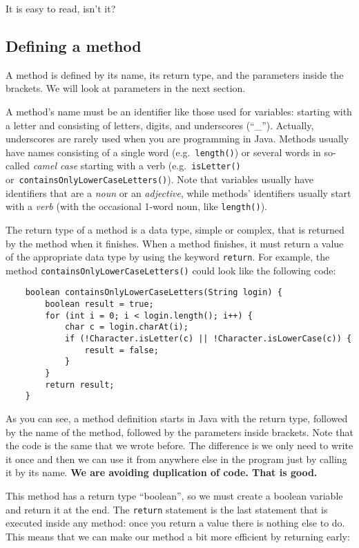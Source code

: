 It is easy to read, isn't it?

\subsection{Defining a method}

A method is defined by its name, its return type, and the parameters
inside the brackets. We will look at parameters in the next section.

A method's name must be an identifier
like those used for variables: starting with a letter and consisting
of letters, digits, and underscores (``\_''). Actually, underscores
are rarely used when you are programming in Java. Methods
usually have names consisting of a single word
(e.g.~\verb+length()+) or several words in so-called \emph{camel case}
starting with a verb (e.g.~\verb+isLetter()+
or~\verb+containsOnlyLowerCaseLetters()+). Note that variables usually
have identifiers that are a \emph{noun} or an \emph{adjective}, 
while methods' identifiers usually start with a \emph{verb} 
(with the occasional 1-word noun, like \verb+length()+).

The return type of a method is a data type, simple or complex, that is
returned by the method when it finishes. When a method finishes, it
must return a value of the appropriate data type by using the keyword
\verb+return+. For example, the method
\verb+containsOnlyLowerCaseLetters()+ could look 
like the following code:

\begin{verbatim}
    boolean containsOnlyLowerCaseLetters(String login) {
        boolean result = true;
        for (int i = 0; i < login.length(); i++) {
            char c = login.charAt(i);
            if (!Character.isLetter(c) || !Character.isLowerCase(c)) {
                result = false;
            }
        }
        return result;
    }
\end{verbatim}

As you can see, a method definition starts in Java with the return
type, followed by the name of the method, followed by the parameters
inside brackets. 
Note that the code is the same that we wrote before. The difference is
we only need to write it once and then we can 
use it from anywhere else in the
program just by calling it by its name. 
\textbf{We are avoiding duplication of code. That is good.}

This method has a return type ``boolean'', so we
must create a boolean variable and return it at the end. The \verb+return+
statement is the last statement that is executed inside any method:
once you return a value there is nothing else to do. This means
that we can make our method a bit more efficient by returning early: 

